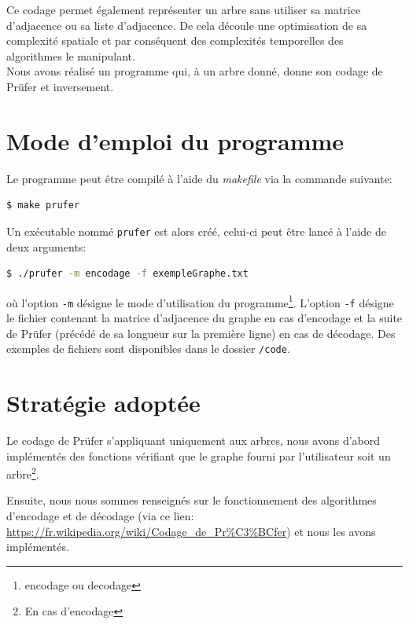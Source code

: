 \documentclass[a4paper, 11pt, oneside]{article}
\begin{document}

Ce codage permet également représenter un arbre sans utiliser sa matrice d'adjacence ou sa liste d'adjacence. De cela découle une optimisation de sa complexité spatiale et par conséquent des complexités temporelles des algorithmes le manipulant.\\

Nous avons réalisé un programme qui, à un arbre donné, donne son codage de Prüfer et inversement.

\section{Mode d'emploi du programme}

Le programme peut être compilé à l'aide du \textit{makefile} via la commande suivante:

\begin{lstlisting}[language=bash]
$ make prufer
\end{lstlisting}

Un exécutable nommé \texttt{prufer} est alors créé, celui-ci peut être lancé à l'aide de deux arguments:

\begin{lstlisting}[language=bash]
$ ./prufer -m encodage -f exempleGraphe.txt
\end{lstlisting}

où l'option \texttt{-m} désigne le mode d'utilisation du programme\footnote{encodage ou decodage}. L'option \texttt{-f} désigne le fichier contenant la matrice d'adjacence du graphe en cas d'encodage et la suite de Prüfer (précédé de sa longueur sur la première ligne) en cas de décodage. Des exemples de fichiers sont disponibles dans le dossier \texttt{/code}.

\section{Stratégie adoptée}

Le codage de Prüfer s'appliquant uniquement aux arbres, nous avons d'abord implémentés des fonctions vérifiant que le graphe fourni par l'utilisateur soit un arbre\footnote{En cas d'encodage}.

Ensuite, nous nous sommes renseignés sur le fonctionnement des algorithmes d'encodage et de décodage (via ce lien: \url{https://fr.wikipedia.org/wiki/Codage_de_Pr%C3%BCfer}) et nous les avons implémentés.
\end{document}
